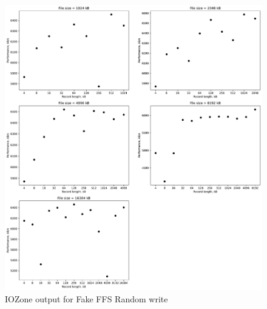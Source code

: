 \begin{figure}[!htb]
	\label{fig:app_bench_fffs_rnd_read}
	\begin{center}
		\includegraphics[width=1.0\textwidth]{figures/benchmarking/fake-ffs/Random write.pdf}
	\end{center}
	\caption{IOZone output for Fake FFS Random write}
\end{figure}

